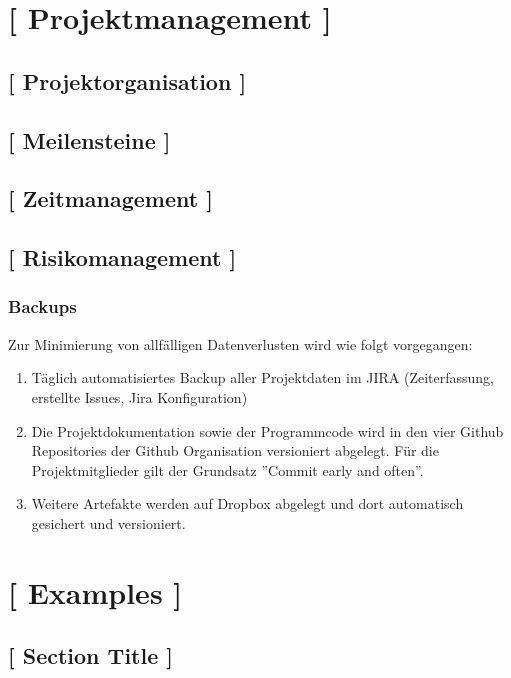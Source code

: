 \documentclass[11pt,a4paper,english,oneside]{book}
\numberwithin{equation}{chapter}
\begin{document}
\chapter{ [ Projektmanagement ]}

\section{ [ Projektorganisation ] }

\section{ [ Meilensteine ] }

\section{ [ Zeitmanagement ] }

\section{ [ Risikomanagement ] }
\subsection{Backups}
Zur Minimierung von allfälligen Datenverlusten wird wie folgt vorgegangen:

\begin{enumerate}
	\item Täglich automatisiertes Backup aller Projektdaten im JIRA \cite{jira} (Zeiterfassung, erstellte Issues, Jira Konfiguration)
	\item Die Projektdokumentation sowie der Programmcode wird in den vier Github Repositories der Github Organisation \cite{github} versioniert abgelegt. Für die Projektmitglieder gilt der Grundsatz ''Commit early and often''.
	\item Weitere Artefakte werden auf Dropbox \cite{dropbox} abgelegt und dort automatisch gesichert und versioniert.
\end{enumerate}

\chapter{ [ Examples ]}

\section{[ Section Title ]}
\end{document}
